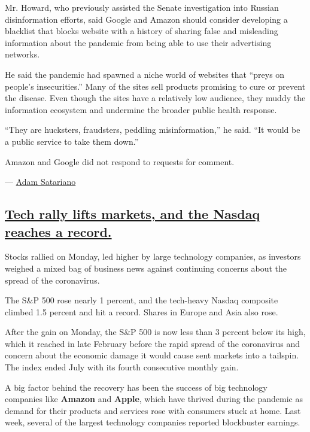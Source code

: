 Mr. Howard, who previously assisted the Senate investigation into
Russian disinformation efforts, said Google and Amazon should consider
developing a blacklist that blocks website with a history of sharing
false and misleading information about the pandemic from being able to
use their advertising networks.

He said the pandemic had spawned a niche world of websites that ``preys
on people's insecurities.'' Many of the sites sell products promising to
cure or prevent the disease. Even though the sites have a relatively low
audience, they muddy the information ecosystem and undermine the broader
public health response.

``They are hucksters, fraudsters, peddling misinformation,'' he said.
``It would be a public service to take them down.''

Amazon and Google did not respond to requests for comment.

--- \href{https://www.nytimes3xbfgragh.onion/by/adam-satariano}{Adam
Satariano}

\hypertarget{tech-rally-lifts-markets-and-the-nasdaq-reaches-a-record}{%
\subsection{\texorpdfstring{\protect\hyperlink{tech-rally-lifts-markets-and-the-nasdaq-reaches-a-record}{Tech
rally lifts markets, and the Nasdaq reaches a
record.}}{Tech rally lifts markets, and the Nasdaq reaches a record.}}\label{tech-rally-lifts-markets-and-the-nasdaq-reaches-a-record}}

Stocks rallied on Monday, led higher by large technology companies, as
investors weighed a mixed bag of business news against continuing
concerns about the spread of the coronavirus.

The S\&P 500 rose nearly 1 percent, and the tech-heavy Nasdaq composite
climbed 1.5 percent and hit a record. Shares in Europe and Asia also
rose.

After the gain on Monday, the S\&P 500 is now less than 3 percent below
its high, which it reached in late February before the rapid spread of
the coronavirus and concern about the economic damage it would cause
sent markets into a tailspin. The index ended July with its fourth
consecutive monthly gain.

A big factor behind the recovery has been the success of big technology
companies like \textbf{Amazon} and \textbf{Apple}, which have thrived
during the pandemic as demand for their products and services rose with
consumers stuck at home. Last week, several of the largest technology
companies reported blockbuster earnings.

